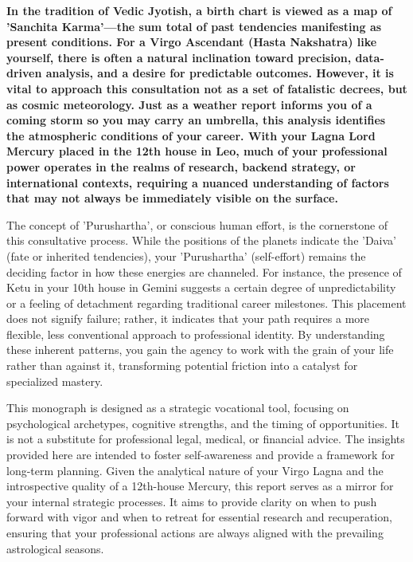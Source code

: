 {\fontsize{9.5}{13.8}\selectfont\bfseries\color{DeepSlate} In the tradition of Vedic Jyotish, a birth chart is viewed as a map of 'Sanchita Karma'---the sum total of past tendencies manifesting as present conditions. For a Virgo Ascendant (Hasta Nakshatra) like yourself, there is often a natural inclination toward precision, data-driven analysis, and a desire for predictable outcomes. However, it is vital to approach this consultation not as a set of fatalistic decrees, but as cosmic meteorology. Just as a weather report informs you of a coming storm so you may carry an umbrella, this analysis identifies the atmospheric conditions of your career. With your Lagna Lord Mercury placed in the 12th house in Leo, much of your professional power operates in the realms of research, backend strategy, or international contexts, requiring a nuanced understanding of factors that may not always be immediately visible on the surface.}\par\vspace{2mm}

{\fontsize{9}{13}\selectfont The concept of 'Purushartha', or conscious human effort, is the cornerstone of this consultative process. While the positions of the planets indicate the 'Daiva' (fate or inherited tendencies), your 'Purushartha' (self-effort) remains the deciding factor in how these energies are channeled. For instance, the presence of Ketu in your 10th house in Gemini suggests a certain degree of unpredictability or a feeling of detachment regarding traditional career milestones. This placement does not signify failure; rather, it indicates that your path requires a more flexible, less conventional approach to professional identity. By understanding these inherent patterns, you gain the agency to work with the grain of your life rather than against it, transforming potential friction into a catalyst for specialized mastery.}\par\vspace{1.8mm}

{\fontsize{9}{13}\selectfont This monograph is designed as a strategic vocational tool, focusing on psychological archetypes, cognitive strengths, and the timing of opportunities. It is not a substitute for professional legal, medical, or financial advice. The insights provided here are intended to foster self-awareness and provide a framework for long-term planning. Given the analytical nature of your Virgo Lagna and the introspective quality of a 12th-house Mercury, this report serves as a mirror for your internal strategic processes. It aims to provide clarity on when to push forward with vigor and when to retreat for essential research and recuperation, ensuring that your professional actions are always aligned with the prevailing astrological seasons.}\par\vspace{1.8mm}

